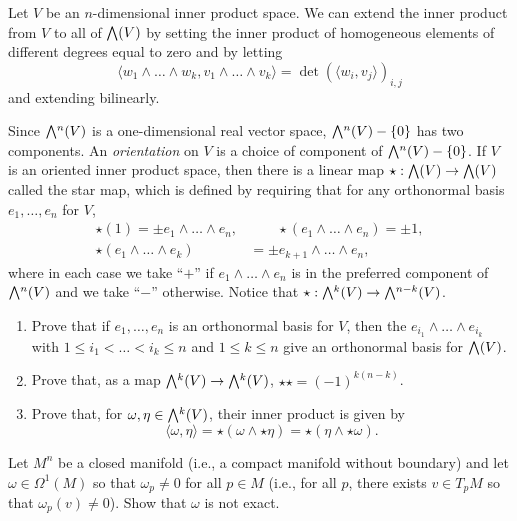 \documentclass[12pt]{memoir}
\begin{document}
\begin{Ej}
    Let $V$ be an $n$-dimensional inner product space. We can extend the inner product from $V$ to all of $\exterior(V)$ by setting the inner product of homogeneous elements of different degrees equal to zero and by letting
	\[
		\langle w_1 \wedge \ldots \wedge w_k, v_1 \wedge \ldots \wedge v_k \rangle = \det \left(\langle w_i, v_j \rangle \right)_{i,j}
	\]
	and extending bilinearly. 
	
	Since $\exterior^n(V)$ is a one-dimensional real vector space, $\exterior^n(V) - \{0\}$ has two components. An \emph{orientation} on $V$ is a choice of component of $\exterior^n(V) - \{0\}$. If $V$ is an oriented inner product space, then there is a linear map $\star: \exterior(V) \to \exterior(V)$ called the star map, which is defined by requiring that for any orthonormal basis $e_1, \ldots , e_n$ for $V$,
	\begin{align*}
		\star(1) = \pm e_1 \wedge \ldots \wedge e_n,  & \qquad \star(e_1 \wedge \ldots \wedge e_n) = \pm 1, \\
		\star(e_1 \wedge \ldots \wedge e_k) & = \pm e_{k+1} \wedge \ldots \wedge e_n,
	\end{align*}
	where in each case we take ``$+$'' if $e_1 \wedge \ldots \wedge e_n$ is in the preferred component of $\exterior^n(V)$ and we take ``$-$'' otherwise. Notice that $\star: \exterior^k(V) \to \exterior^{n-k}(V)$.
	
	\begin{enumerate}
		\item Prove that if $e_1, \ldots , e_n$ is an orthonormal basis for $V$, then the $e_{i_1} \wedge \ldots \wedge e_{i_k}$ with $1 \leq i_1 < \ldots < i_k \leq n$ and $1 \leq k \leq n$ give an orthonormal basis for $\exterior(V)$.
		\item Prove that, as a map $\exterior^k(V) \to \exterior^k(V)$, $\star \star = (-1)^{k(n-k)}$.
		\item Prove that, for $\omega, \eta \in \exterior^k(V)$, their inner product is given by
		\[
			\langle \omega, \eta \rangle = \star (\omega \wedge \star \eta) = \star(\eta \wedge \star \omega).
		\]
	\end{enumerate}
\end{Ej}

\begin{Ej}
    Let $M^n$ be a closed manifold (i.e., a compact manifold without boundary) and let $\omega \in \Omega^1(M)$ so that $\omega_p \neq 0$ for all $p \in M$ (i.e., for all $p$, there exists $v \in T_pM$ so that $\omega_p(v) \neq 0$). Show that $\omega$ is not exact.
\end{Ej}
\end{document}

